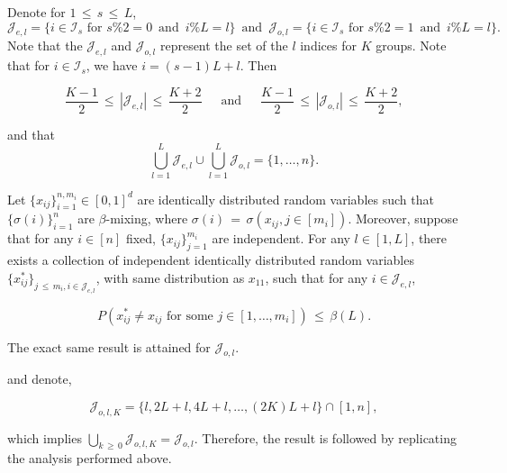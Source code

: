 \documentclass[twoside,11pt]{article}
\begin{document}
Denote for \(1 \,\leq\, s \,\leq\, L\),
\[
\mathcal{J}_{e, l} = \{i \in \mathcal{I}_s \text{ for } s\%2 = 0 \,\,\,\text{and}\,\,\, i\%L = l\} \,\,\,\text{and}\,\,\, \mathcal{J}_{o, l} = \{i \in \mathcal{I}_s \text{ for } s\%2 = 1 \,\,\,\text{and}\,\,\, i\%L = l\}.
\]
Note that the $\mathcal{J}_{e, l}$ and $\mathcal{J}_{o, l}$ represent the set of the $l$ indices for $K$ groups. 
Note that for $i\in \mathcal{I}_s$, we have 
$i = (s-1)L + l$.
Then

\[
\frac{K - 1}{2} \,\leq\, |\mathcal{J}_{e, l}| \,\leq\, \frac{K + 2}{2} \quad \,\,\,\text{and}\,\,\, \quad \frac{K - 1}{2} \,\leq\, |\mathcal{J}_{o, l}| \,\leq\, \frac{K + 2}{2},
\]

and that
\[
\bigcup_{l=1}^L \mathcal{J}_{e,l} \cup \bigcup_{l=1}^L \mathcal{J}_{o,l} = \{1, \ldots, n\}.
\]

\begin{lemma}
\label{Lemma_9}  
Let \(\{x_{ij}\}^{n,m_i}_{i=1} \in [0,1]^d\) are identically distributed random variables such that \(\{\sigma(i)\}^{n}_{i=1}\) are \(\beta\)-mixing, where \(\sigma(i) \,=\, \sigma(x_{ij}, j \in [m_i])\). Moreover, suppose that for any \(i \in [n]\) fixed, \(\{x_{ij}\}^{m_i}_{j=1}\) are independent. For any \(l \in [1, L]\), there exists a collection of independent identically distributed random variables \(\{x_{ij}^*\}_{j \,\leq\, m_i, i \in \mathcal{J}_{e,l}}\), with same distribution as \(x_{11}\), such that for any \(i \in \mathcal{J}_{e,l}\),

\[
P(x_{ij}^* \neq x_{ij} \text{ for some } j \in [1, \ldots, m_i]) \,\leq\, \beta(L).
\]

The exact same result is attained for \(\mathcal{J}_{o,l}\).

and denote,

\[
\mathcal{J}_{o,l,K} = \{l, 2L + l, 4L + l, \ldots, (2K)L + l\} \cap [1,n],
\]

which implies \(\bigcup_{k \,\geq\, 0}\mathcal{J}_{o,l,K} = \mathcal{J}_{o,l}\). Therefore, the result is followed by replicating the analysis performed above.
\end{lemma}
 
\end{document}

